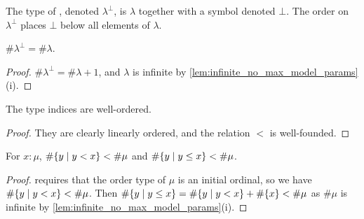 \begin{definition}
    The type of , denoted \( \lambda^\bot \), is \( \lambda \) together with a symbol denoted \( \bot \).
    The order on \( \lambda^\bot \) places \( \bot \) below all elements of \( \lambda \).
\end{definition}
\begin{lemma}
    \label{lem:mk_typeIndex}
    \( \#\lambda^\bot = \#\lambda \).
\end{lemma}
\begin{proof}
    \( \#\lambda^\bot = \#\lambda + 1 \), and \( \lambda \) is infinite by \cref{lem:infinite_no_max_model_params}(i).
\end{proof}
\begin{lemma}
    \label{lem:typeIndex_wf}
    The type indices are well-ordered.
\end{lemma}
\begin{proof}
    They are clearly linearly ordered, and the relation \( < \) is well-founded.
\end{proof}
\begin{lemma}
    \label{lem:card_Iio_lt}
    For \( x : \mu \), \( \#\qty{y \mid y < x} < \#\mu \) and \( \#\qty{y \mid y \leq x} < \#\mu \).
\end{lemma}
\begin{proof}
     requires that the order type of \( \mu \) is an initial ordinal, so we have \( \#\qty{y \mid y < x} < \#\mu \).
    Then \( \#\qty{y \mid y \leq x} = \#\qty{y \mid y < x} + \#\qty{x} < \#\mu \) as \( \#\mu \) is infinite by \cref{lem:infinite_no_max_model_params}(i).
\end{proof}
